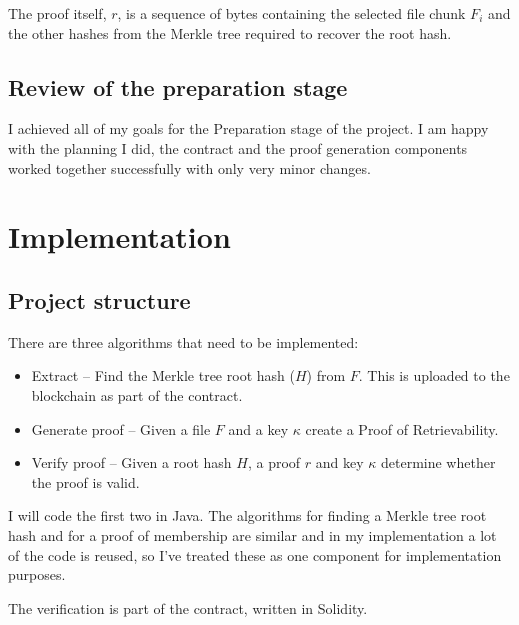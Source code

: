 \documentclass[12pt,a4paper,twoside,openright]{report}
\begin{document}
The proof itself, $r$, is a sequence of bytes containing the selected file chunk $F_i$ and the other hashes from the Merkle tree required to recover the root hash.


\section{Review of the preparation stage}

I achieved all of my goals for the Preparation stage of the project.
I am happy with the planning I did, the contract and the proof generation components worked together successfully with only very minor changes.





\chapter{Implementation}

\section{Project structure}
\label{pseudo-code}

There are three algorithms that need to be implemented:
\begin{itemize}
\item Extract -- Find the Merkle tree root hash (${H}$) from $F$. This is uploaded to the blockchain as part of the contract.
\item Generate proof -- Given a file $F$ and a key $\kappa$ create a Proof of Retrievability.
\item Verify proof -- Given a root hash ${H}$, a proof $r$ and key $\kappa$ determine whether the proof is valid.
\end{itemize}

I will code the first two in Java.
The algorithms for finding a Merkle tree root hash and for a proof of membership are similar
and in my implementation a lot of the code is reused, so I've treated these as one component for implementation purposes.

The verification is part of the contract, written in Solidity.
\end{document}
